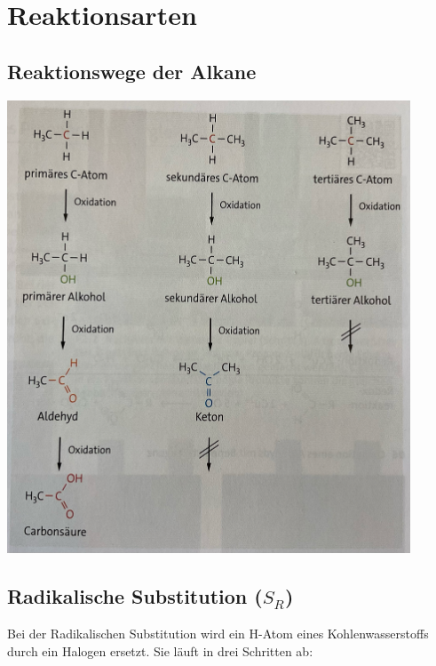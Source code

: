 \documentclass[a4paper]{article}
\begin{document}
\section{Reaktionsarten}

\subsection{Reaktionswege der Alkane}
\begin{center}
    \includegraphics[width=12cm]{Bilder/ReaktionswegeAlkane.png}
\end{center}



\subsection{Radikalische Substitution ($S_R$)}

Bei der Radikalischen Substitution wird ein H-Atom eines Kohlenwasserstoffs durch ein Halogen ersetzt.
Sie läuft in drei Schritten ab:\\
\end{document}
